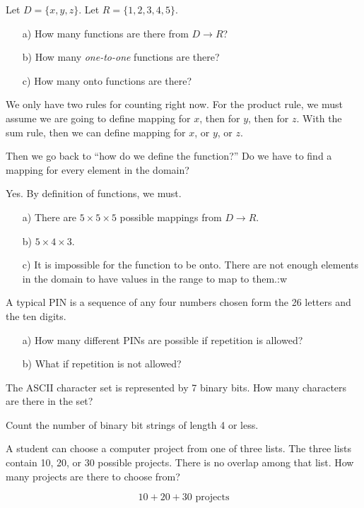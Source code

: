 \begin{ex}
  Let \(D = \{x, y, z\}\). Let \(R=\{1,2,3,4,5\}\).
  \begin{itemize}
    \item[a) ] How many functions are there from \(D\to R\)?
    \item[b) ] How many \emph{one-to-one} functions are there?
    \item[c) ] How many onto functions are there?
  \end{itemize}
  \begin{sol}
    We only have two rules for counting right now.
    For the product rule, we must assume we are going to define mapping for \(x\), then for \(y\), then for \(z\).
    With the sum rule, then we can define mapping for \(x\), or \(y\), or \(z\).

    Then we go back to ``how do we define the function?'' Do we have to find a mapping for every element in the domain?

    Yes. By definition of functions, we must.


    \begin{itemize}
      \item[a) ] There are \(5 \times 5 \times 5\) possible mappings from \(D \to R\).
      \item[b) ] \(5\times4\times3\).
      \item[c) ] It is impossible for the function to be onto. There are not enough elements in the domain to have values in the range to map to them.:w
    \end{itemize}
  \end{sol}
\end{ex}
\begin{ex}
  A typical PIN is a sequence of any four numbers chosen form the 26 letters and the ten digits.
  \begin{itemize}
  \item[a) ] How many different PINs are possible if repetition is allowed?
    \item[b) ] What if repetition is not allowed?
  \end{itemize}
  \end{ex}
\begin{ex}
  The ASCII character set is represented by 7 binary bits. How many characters are there in the set?
\end{ex}
\begin{ex}
  Count the number of binary bit strings of length 4 or less.
\end{ex}
\begin{ex}
  A student can choose a computer project from one of three lists. The three lists contain 10, 20, or 30 possible projects. There is no overlap among that list. How many projects are there to choose from?
  \begin{sol}
    \[10+20+30 \text{ projects}\]
  \end{sol}
\end{ex}

